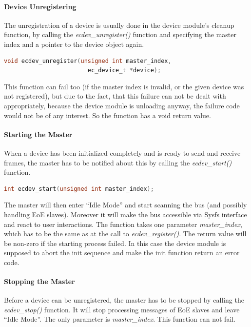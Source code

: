 \documentclass[a4paper,12pt,BCOR6mm,bibtotoc,idxtotoc]{scrbook}
\begin{document}
\paragraph{Device Unregistering}

The unregistration of a device is usually done in the device module's
cleanup function, by calling the \textit{ecdev\_unregister()} function
and specifying the master index and a pointer to the device object
again.

\begin{lstlisting}[language=C]
  void ecdev_unregister(unsigned int master_index,
                        ec_device_t *device);
\end{lstlisting}

This function can fail too (if the master index is invalid, or the
given device was not registered), but due to the fact, that this
failure can not be dealt with appropriately, because the device module
is unloading anyway, the failure code would not be of any interest. So
the function has a void return value.

\paragraph{Starting the Master}

When a device has been initialized completely and is ready to send and
receive frames, the master has to be notified about this by calling
the \textit{ecdev\_start()} function.

\begin{lstlisting}[language=C]
  int ecdev_start(unsigned int master_index);
\end{lstlisting}

The master will then enter ``Idle Mode'' and start scanning the bus
(and possibly handling EoE slaves). Moreover it will make the bus
accessible via Sysfs interface and react to user interactions. The
function takes one parameter \textit{master\_index}, which has to be
the same as at the call to \textit{ecdev\_register()}. The return
value will be non-zero if the starting process failed. In this case
the device module is supposed to abort the init sequence and make the
init function return an error code.

\paragraph{Stopping the Master}

Before a device can be unregistered, the master has to be stopped by
calling the \textit{ecdev\_stop()} function. It will stop processing
messages of EoE slaves and leave ``Idle Mode''. The only parameter is
\textit{master\_index}. This function can not fail.
\end{document}
